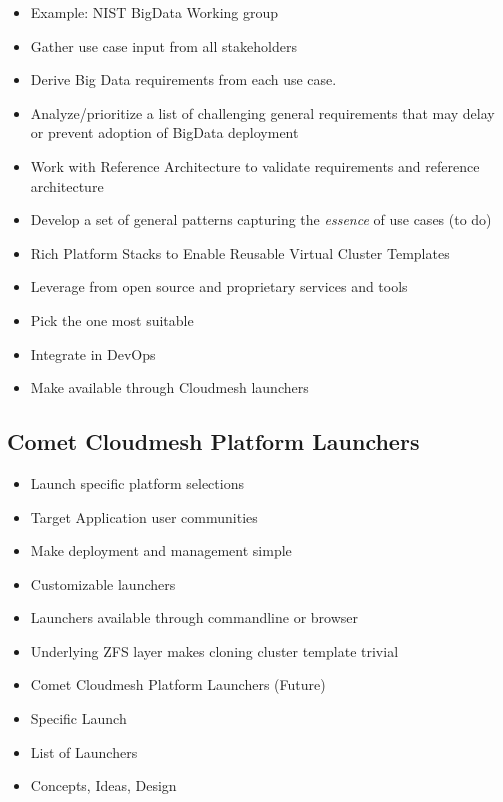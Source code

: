 \begin{itemize}
\item Example: NIST BigData Working group
\item Gather use case input from all stakeholders 
\item Derive Big Data requirements from each use case.
\item Analyze/prioritize a list of challenging general requirements that may delay or prevent adoption of BigData deployment 
\item Work with Reference Architecture to validate requirements and reference architecture
\item Develop a set of general patterns capturing the {\em essence} of use cases (to do)
\item Rich Platform Stacks to Enable Reusable Virtual Cluster Templates
\item Leverage from open source and proprietary services and tools
\item Pick the one most suitable
\item Integrate in DevOps
\item Make available through Cloudmesh launchers
\end{itemize}

\subsection{Comet Cloudmesh Platform Launchers}

\begin{itemize}
\item Launch specific platform selections
\item Target Application user communities
\item Make deployment and management simple
\item Customizable launchers
\item Launchers available through commandline or browser
\item Underlying ZFS layer makes cloning cluster template trivial
\item Comet Cloudmesh Platform Launchers (Future)
\item Specific Launch
\item List of Launchers
\item Concepts, Ideas, Design
\end{itemize}

